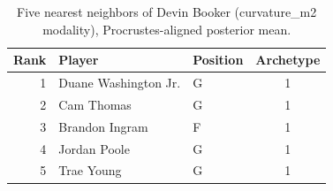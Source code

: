 \begin{table}[htbp]
  \centering\small
  \begin{tabular}{rllc}
    \toprule
    Rank & Player & Position & Archetype \\
    \midrule
    1 & Duane Washington Jr. & G & 1 \\
    2 & Cam Thomas & G & 1 \\
    3 & Brandon Ingram & F & 1 \\
    4 & Jordan Poole & G & 1 \\
    5 & Trae Young & G & 1 \\
    \bottomrule
  \end{tabular}
  \caption{Five nearest neighbors of Devin Booker (curvature_m2 modality), Procrustes-aligned posterior mean.}
  \label{tab:Devin_Booker_neighbors_curvature_m2}
\end{table}

